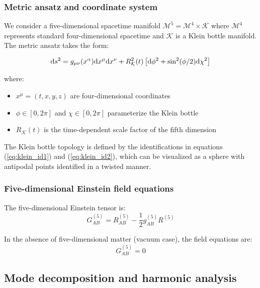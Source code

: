 \documentclass[12pt]{iopart}
\newcommand{\Klein}{\mathcal{K}}
\newcommand{\KleinRadius}{R_\Klein}
\begin{document}
\subsubsection{Metric ansatz and coordinate system}

We consider a five-dimensional spacetime manifold $\mathcal{M}^5 = \mathcal{M}^4 \times \Klein$ where $\mathcal{M}^4$ represents standard four-dimensional spacetime and $\Klein$ is a Klein bottle manifold. The metric ansatz takes the form:

\begin{equation}
{\rm d}s^2 = g_{\mu\nu}(x^\alpha) {\rm d}x^\mu {\rm d}x^\nu + \KleinRadius^2(t) \left[ {\rm d}\phi^2 + \sin^2(\phi/2) {\rm d}\chi^2 \right]
\label{eq:full_5d_metric}
\end{equation}

where:
\begin{itemize}
\item $x^\mu = (t, x, y, z)$ are four-dimensional coordinates
\item $\phi \in [0, 2\pi]$ and $\chi \in [0, 2\pi]$ parameterize the Klein bottle
\item $\KleinRadius(t)$ is the time-dependent scale factor of the fifth dimension
\end{itemize}

The Klein bottle topology is defined by the identifications in equations (\ref{eq:klein_id1}) and (\ref{eq:klein_id2}), which can be visualized as a sphere with antipodal points identified in a twisted manner.

\subsubsection{Five-dimensional Einstein field equations}

The five-dimensional Einstein tensor is:
\begin{equation}
G^{(5)}_{AB} = R^{(5)}_{AB} - \frac{1}{2} g^{(5)}_{AB} R^{(5)}
\label{eq:5d_einstein_tensor}
\end{equation}

In the absence of five-dimensional matter (vacuum case), the field equations are:
\begin{equation}
G^{(5)}_{AB} = 0
\label{eq:5d_vacuum_equations}
\end{equation}

\subsection{Mode decomposition and harmonic analysis}
\end{document}
